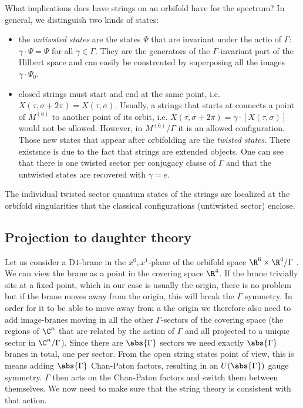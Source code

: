 \documentclass{worksheetclass}
\begin{document}
        What implications does have strings on an orbifold have for the spectrum? In general, we distinguish two kinds of states:
        \begin{itemize}
            \item the \emph{untiwsted states} are the states $\Psi$ that are invariant under the actio of $\Gamma$: $\gamma\cdot\Psi=\Psi$ for all $\gamma\in \Gamma$. They are the generators of the $\Gamma$-invariant part of the Hilbert space and can easily be constrcuted by superposing all the images $\gamma\cdot\Psi_0$.
            \item closed strings must start and end at the same point, i.e. $X(\tau,\sigma+2\pi)=X(\tau,\sigma)$. Usually, a strings that starts at connects a point of $M^{(6)}$ to another point of its orbit, i.e. $X(\tau,\sigma+2\pi)=\gamma\cdot[X(\tau,\sigma)]$ would not be allowed. However, in $M^{(6)}/\Gamma$ it is an allowed configuration. Those new states that appear after orbifolding are the \emph{twisted states}. There existsnce is due to the fact that strings are extended objects. One can see that there is one twisted sector per conjugacy classe of $\Gamma$  and that the untwisted states are recovered with $\gamma=e$.
        \end{itemize}
        The individual twisted sector quantum states of the strings are localized at the orbifold singularities that the classical configurations (untiwisted sector) enclose.

    \subsection{Projection to daughter theory}


        Let us consider a D$1$-brane in the $x^0,x^1$-plane of the orbifold space $\R^6\times\R^4/\Gamma$ \cite{johnson_1997,johnson_2002}. We can view the brane as a point in the covering space $\R^4$. If the brane trivially sits at a fixed point, which in our case is usually the origin, there is no problem but if the brane moves away from the origin, this will break the $\Gamma$ symmetry. In order for it to be able to move away from a the origin we therefore also need to add image-branes moving in all the other $\Gamma$-sectors of the covering space (the regions of $\C^n$ that are related by the action of $\Gamma$ and all projected to a unique sector in $\C^n/\Gamma$). Since there are $\abs{\Gamma}$ sectors we need exactly $\abs{\Gamma}$ branes in total, one per sector. From the open string states point of view, this is means adding $\abs{\Gamma}$ Chan-Paton factors, resulting in an $U(\abs{\Gamma})$ gauge symmetry. $\Gamma$ then acts on the Chan-Paton factors and switch them between themselves. We now need to make sure that the string theory is consistent with that action. 
        
\end{document}
